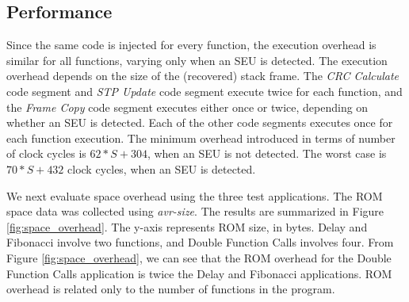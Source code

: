 \subsection{Performance}
\vspace{-10pt}
Since the same code is injected for every function, the execution overhead is similar for all functions, varying only when an SEU is detected. The execution overhead depends on the size of the (recovered) stack frame. The \textit{CRC Calculate} code segment and \textit{STP Update} code segment execute twice for each function, and the \textit{Frame Copy} code segment executes either once or twice, depending on whether an SEU is detected. Each of the other code segments executes once for each function execution. The minimum overhead introduced in terms of number of clock cycles is $62*S+304$, when an SEU is not detected. The worst case is $70*S+432$ clock cycles, when an SEU is detected. 

We next evaluate space overhead using the three test applications. The ROM space data was collected using \textit{avr-size}. The results are summarized in Figure \ref{fig:space_overhead}. The y-axis represents ROM size, in bytes. Delay and Fibonacci involve two functions, and Double Function Calls involves four. From Figure \ref{fig:space_overhead}, we can see that the ROM overhead for the Double Function Calls application is twice the Delay and Fibonacci applications. ROM overhead is related only to the number of functions in the program.
\vspace{-15pt}
